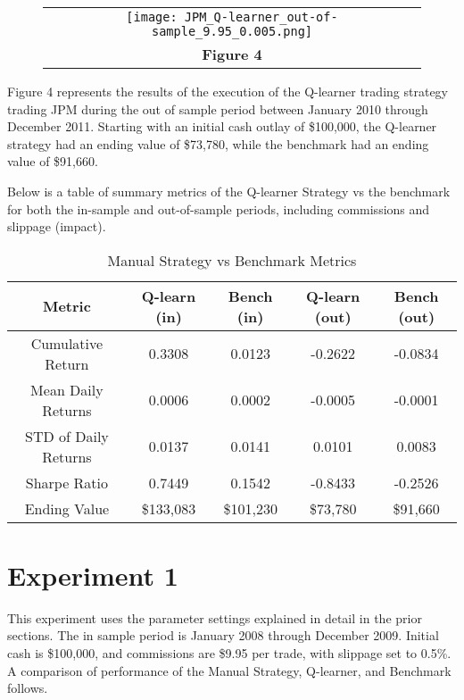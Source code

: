 \documentclass[
	letterpaper, %
]{jdf}
\begin{document}
\pagebreak

\begin{figure}[h]
	\begin{tabular}{c}
		\texttt{[image: JPM\_Q-learner\_out-of-sample\_9.95\_0.005.png]} \\
		\textbf{Figure 4} \\
	\end{tabular}
\end{figure}

Figure 4 represents the results of the execution of the Q-learner trading strategy trading JPM during the out of sample period between January 2010 through December 2011.  Starting with an initial cash outlay of \$100,000, the Q-learner strategy had an ending value of \$73,780, while the benchmark had an ending value of \$91,660.

Below is a table of summary metrics of the Q-learner Strategy vs the benchmark for both the in-sample and out-of-sample periods, including commissions and slippage (impact).

\begin{table}[h]
\centering
\begin{tabular}{ c | c | c | c | c}
  \hline
  Metric & Q-learn (in) & Bench (in) & Q-learn (out) & Bench (out) \\
  \hline   
 
Cumulative Return & 0.3308 & 0.0123 & -0.2622 & -0.0834 \\
Mean Daily Returns & 0.0006 & 0.0002 & -0.0005 & -0.0001 \\
STD of Daily Returns & 0.0137 & 0.0141 & 0.0101 & 0.0083 \\
Sharpe Ratio & 0.7449 & 0.1542 & -0.8433 & -0.2526 \\
Ending Value & \$133,083 & \$101,230 & \$73,780 & \$91,660 \\
  \hline
\end{tabular}
\caption{Manual Strategy vs Benchmark Metrics}
\label{tbl:topic_overlap}
\end{table}

\section{Experiment 1}

This experiment uses the parameter settings explained in detail in the prior sections.  The in sample period is January 2008 through December 2009. Initial cash is \$100,000, and commissions are \$9.95 per trade, with slippage set to 0.5\%. A comparison of performance of the Manual Strategy, Q-learner, and Benchmark follows. 
\end{document}
